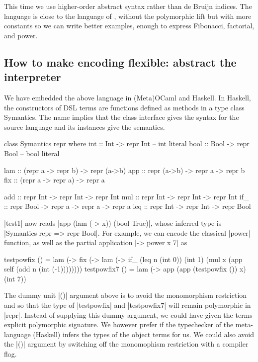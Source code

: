 \documentclass[preprint]{sigplanconf}
\let\cite=\citep
\begin{document}
This time we use higher-order abstract syntax \cite{DaleMiller}
rather than de Bruijn indices.  The
language is close to the language of \citet{xi-guarded}, without the polymorphic
lift but with more constants so we can write better examples, enough to
express Fibonacci, factorial, and power.

\subsection{How to make encoding flexible: abstract the interpreter}
\label{encoding}
We have embedded the above language in (Meta)OCaml and Haskell.  In Haskell,
the constructors of DSL terms are functions defined as methods in a type class
Symantics. The name implies that the class interface gives the syntax for
the source language and its instances give the semantics.

\begin{code}
class Symantics repr where
  int :: Int   -> repr Int          -- int literal
  bool :: Bool -> repr Bool         -- bool literal

  lam :: (repr a -> repr b) -> repr (a->b)
  app :: repr (a->b) -> repr a -> repr b
  fix :: (repr a -> repr a) -> repr a

  add :: repr Int  -> repr Int -> repr Int
  mul :: repr Int  -> repr Int -> repr Int
  if_ :: repr Bool -> repr a   -> repr a -> repr a
  leq :: repr Int  -> repr Int -> repr Bool
\end{code}

\noindent |test1| now reads |app (lam (\x -> x)) (bool True)|,
whose inferred type is |Symantics repr => repr Bool|.
For example, we can encode the classical |power| function, as well
as the partial application |\x -> power x 7| as

\begin{code}
testpowfix () = 
  lam (\x -> fix (\self -> lam (\n ->
        if_ (leq n (int 0)) (int 1)
            (mul x (app self (add n (int (-1))))))))
testpowfix7 () = 
  lam (\x -> app (app (testpowfix ()) x) (int 7))
\end{code}
The dummy unit |()| argument above is to avoid the monomorphism
restriction and so that the type of |testpowfix| and |testpowfix7|
will remain polymorphic in |repr|. Instead of supplying this dummy
argument, we could have given the terms explicit polymorphic
signature.  We however prefer if the typechecker of the meta-language
(Haskell) infers the types of the object terms for us. We could also
avoid the |()| argument by switching off the monomophism restriction
with a compiler flag.
\end{document}
